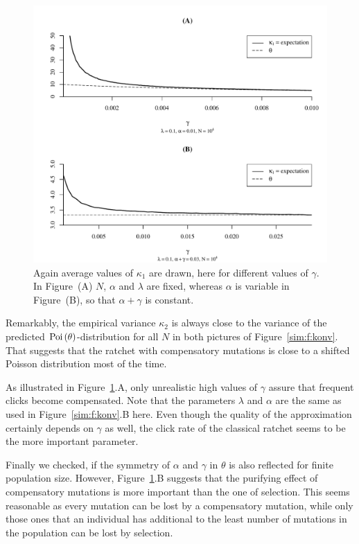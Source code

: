 \begin{figure}[h]
  \begin{center}
	\includegraphics[width=13cm]{img/gammaVSalpha.pdf}
  \end{center}
  \caption{\label{sim:f:dif_gamma} Again average values of $\kappa_1$ are drawn, here for different
  values of $\gamma$. In Figure~(A) $N$, $\alpha$ and $\lambda$ are fixed, whereas $\alpha$ is
  variable in Figure~(B), so that $\alpha + \gamma$ is constant.}
\end{figure}

\noindent
Remarkably, the empirical variance $\kappa_2$ is always close to the variance
of the predicted $\text{Poi} \left( \theta \right)$-distribution for all $N$ in both pictures of
Figure~\ref{sim:f:konv}. That suggests that the ratchet with compensatory
mutations is close to a shifted Poisson distribution most of the time.

As illustrated in Figure~\ref{sim:f:dif_gamma}.A, only unrealistic high values
of $\gamma$ assure that frequent clicks become compensated. Note that the
parameters $\lambda$ and $\alpha$ are the same as used in
Figure~\ref{sim:f:konv}.B here. Even though the quality of the approximation
certainly depends on $\gamma$ as well, the click rate of the classical ratchet
seems to be the more important parameter.

Finally we checked, if the symmetry of $\alpha$ and $\gamma$ in $\theta$ is also
reflected for finite population size. However, Figure~\ref{sim:f:dif_gamma}.B
suggests that the purifying effect of compensatory mutations is more important
than the one of selection. This seems reasonable as every mutation can be lost
by a compensatory mutation, while only those ones that an individual has
additional to the least number of mutations in the population can be lost by selection.